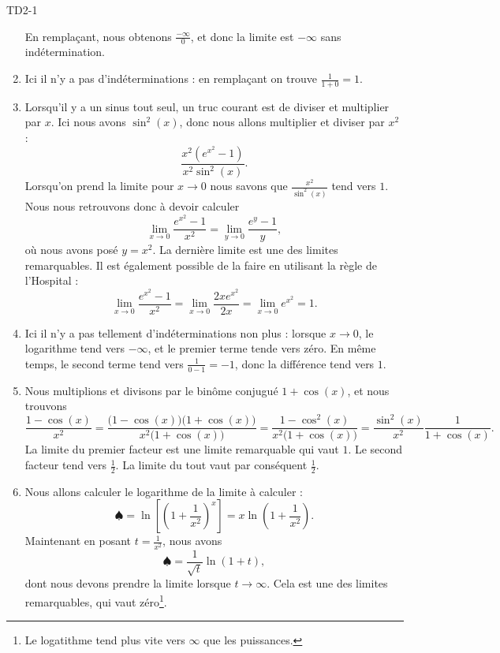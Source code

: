 \begin{corrige}{TD2-1}
\begin{enumerate}
			En remplaçant, nous obtenons $\frac{ -\infty }{  0}$, et donc la limite est $-\infty$ sans indétermination.
		\item
			Ici il n'y a pas d'indéterminations : en remplaçant on trouve $\frac{ 1 }{ 1+0 }=1$.
		\item
			Lorsqu'il y a un sinus tout seul, un truc courant est de diviser et multiplier par $x$. Ici nous avons $\sin^2(x)$, donc nous allons multiplier et diviser par $x^2$ :
			\begin{equation}
				\frac{ x^2( e^{x^2}-1) }{ x^2\sin^2(x) }.
			\end{equation}
			Lorsqu'on prend la limite pour $x\to 0$ nous savons que $\frac{ x^2 }{ \sin^2(x) }$ tend vers $1$. Nous nous retrouvons donc à devoir calculer
			\begin{equation}
				\lim_{x\to 0} \frac{  e^{x^2}-1 }{ x^2 }=\lim_{y\to 0}\frac{ e^y-1 }{ y }, 
			\end{equation}
			où nous avons posé $y=x^2$. La dernière limite est une des limites remarquables. Il est également possible de la faire en utilisant la règle de l'Hospital :
            \begin{equation}
                \lim_{x\to 0} \frac{  e^{x^2}-1 }{ x^2 }=\lim_{x\to 0} \frac{ 2x e^{x^2} }{ 2x }=\lim_{x\to 0}  e^{x^2}=1.
            \end{equation}
		\item
			Ici il n'y a pas tellement d'indéterminations non plus : lorsque $x\to 0$, le logarithme tend vers $-\infty$, et le premier terme tende vers zéro. En même temps, le second terme tend vers $\frac{1}{ 0-1 }=-1$, donc la différence tend vers $1$.
		\item
			Nous multiplions et divisons par le binôme conjugué $1+\cos(x)$, et nous trouvons
			\begin{equation}
                \frac{ 1-\cos(x) }{ x^2 }=\frac{ \big( 1-\cos(x) \big)\big( 1+\cos(x) \big) }{ x^2\big( 1+\cos(x) \big) }=\frac{ 1-\cos^2(x) }{ x^2\big( 1+\cos(x) \big) }=\frac{ \sin^2(x) }{ x^2 }\frac{1}{ 1+\cos(x) }.
			\end{equation}
            La limite du premier facteur est une limite remarquable qui vaut \( 1\). Le second facteur tend vers \( \frac{ 1 }{2}\). La limite du tout vaut par conséquent \( \frac{ 1 }{2}\).
		\item
			Nous allons calculer le logarithme de la limite à calculer :
            \begin{equation}        \label{EqBtkUpe}
				\spadesuit=\ln\left[ \left( 1+\frac{1}{ x^2 } \right)^x \right]=x\ln\left( 1+\frac{1}{ x^2 } \right).
			\end{equation}
			Maintenant en posant $t=\frac{1}{ x^2 }$, nous avons
			\begin{equation}
				\spadesuit=\frac{1}{ \sqrt{t} }\ln(1+t),
			\end{equation}
            dont nous devons prendre la limite lorsque $t\to \infty$. Cela est une des limites remarquables, qui vaut zéro\footnote{Le logatithme tend plus vite vers \( \infty\) que les puissances.}.


\end{enumerate}
\end{corrige}
